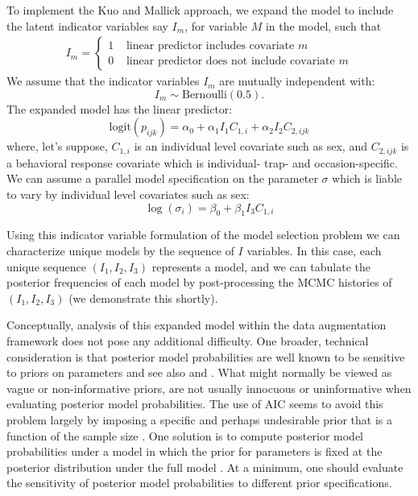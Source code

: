 To implement the Kuo and Mallick approach, we expand the model to
include the latent indicator variables say $I_{m}$, for variable $M$
in the model, such that
\begin{eqnarray*}
I_{m} = \left\{
\begin{array}{cc} 1 &  \mbox{ linear predictor includes  covariate $m$} \\
                  0 & \mbox{ linear predictor does not
                                include covariate $m$}
 \end{array}
\right.
\end{eqnarray*}
We assume that the indicator variables $I_{m}$ are mutually
independent with:
\[
I_m \sim \mbox{Bernoulli}(0.5).
\]
The expanded model has the linear predictor:
\[
\mbox{logit}(p_{ijk}) = \alpha_{0} + \alpha_{1}I_{1} C_{1,i} + \alpha_{2}I_{2} C_{2,ijk}
\]
where, let's suppose, $C_{1,i}$ is an individual level covariate such
as sex, and $C_{2,ijk}$ is a behavioral response covariate which is
individual- trap- and occasion-specific.  We can assume a parallel
model specification on the parameter $\sigma$ which is liable to vary
by individual level covariates such as sex:
\[
 \log(\sigma_{i}) = \beta_{0} + \beta_{1} I_{3} C_{1,i}
\]

Using this indicator variable formulation of the model selection
problem we can characterize unique models by the sequence of $I$
variables. In this case, each unique sequence $(I_{1},I_{2},I_{3})$
represents a model, and we can tabulate the posterior frequencies of
each model by post-processing the MCMC histories of
$(I_{1},I_{2},I_{3})$ (we demonstrate this shortly).

Conceptually, analysis of this expanded model within the data
augmentation framework does not pose any additional difficulty. One
broader, technical consideration is that posterior model probabilities
are well known to be sensitive to priors on parameters
\citep{aitkin:1991, link_barker:2006} and see also
\citet[][Sec. 3.4.3]{royle_dorazio:2008} and
\citet[][Sec. 7.2.5]{link_barker:2010}.  What might normally be viewed
as vague or non-informative priors, are not usually innocuous or
uninformative when evaluating posterior model probabilities. The use
of AIC seems to avoid this problem largely by imposing a specific and
perhaps undesirable prior that is a function of the sample size
\citep{kadane_lazar:2004}. One solution is to compute posterior model
probabilities under a model in which the prior for parameters is fixed
at the posterior distribution under the full model
\citep{aitkin:1991}. At a minimum, one should evaluate the sensitivity
of posterior model probabilities to different prior specifications.


